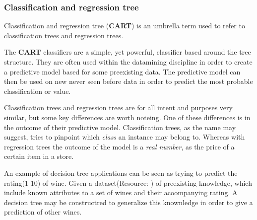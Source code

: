 \subsubsection{Classification and regression tree}
	Classification and regression tree (\textbf{CART}) is an umbrella term used to refer to
	classification trees and regression trees.\cite{trees:umbrella}

	\bigskip\noindent The \textbf{CART} classifiers are a simple, yet powerful, classifier based around the tree structure. 
	They are often used within the datamining discipline in order to create a predictive model based for some preexisting data.
	The predictive model can then be used on new never seen before data in order to predict the most probable classification or value. 
	
	\bigskip\noindent Classification trees and regression trees are for all intent and purposes very similar, but some key differences are worth noteing. 
	One of these differences is in the outcome of their predictive model. 
	Classification trees, as the name may suggest, tries to pinpoint which \textit{class} an instance may belong to. 
	Whereas with regression trees the outcome of the model is a \textit{real number}, as the price of a certain item in a store. 
	
	\bigskip\noindent
	An example of decision tree applications can be seen as trying to predict the rating(1-10) of wine. 
	Given a dataset(Resource: \cite{mining:datasetexample}) of preexisting knowledge, which include known attributes to a set of wines and their acoompanying rating.
	A decision tree may be constructred to generalize this knownledge in order to give a prediction of other wines. 	
		
	
